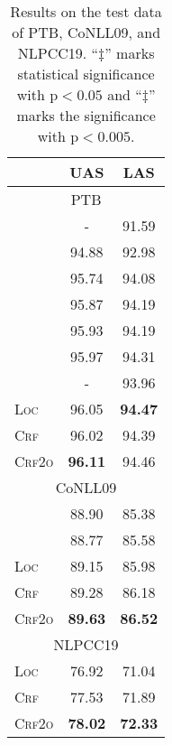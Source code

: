 \begin{table}[hbt]
  \centering
  \begin{tabular}{lcc}
  \hline
  & UAS & LAS \\
  \hline
  \hline
  \multicolumn{3}{c}{PTB} \\
  \hline
  \citet{falenska-kuhn-2019-non}     & -     & 91.59 \\
  \citet{ma-hovy-2017-neural}        & 94.88 & 92.98 \\
  \citet{Timothy-d17-biaffine}       & 95.74 & 94.08 \\
  \citet{ma-etal-2018-stack}         & 95.87 & 94.19 \\
  \citet{li-etal-2019-attentive}     & 95.93 & 94.19 \\
  \citet{ji-etal-2019-graph}         & 95.97 & 94.31 \\
  \citet{zhang-etal-2019-empirical}  & -     & 93.96 \\
  \textsc{Loc}   & 96.05          & \textbf{94.47} \\
  \textsc{Crf}     & 96.02          & 94.39 \\
  \textsc{Crf2o}  & \textbf{96.11} & 94.46 \\
  \hline
  \hline
  \multicolumn{3}{c}{CoNLL09} \\
  \hline
  \citet{Timothy-d17-biaffine}   & 88.90 & 85.38 \\
  \citet{li-etal-2019-attentive} & 88.77 & 85.58 \\
  \textsc{Loc}                 & 89.15 & 85.98 \\
  \textsc{Crf}                   & 89.28 & 86.18\rlap{$^\dagger$} \\
  \textsc{Crf2o}                & \textbf{89.63}\rlap{$^\ddagger$} & \textbf{86.52}\rlap{$^\ddagger$} \\
  \hline
  \hline
  \multicolumn{3}{c}{NLPCC19} \\
  \hline
  \textsc{Loc}  & 76.92 & 71.04 \\
  \textsc{Crf}    & 77.53\rlap{$^\ddagger$} & 71.89\rlap{$^\ddagger$} \\
  \textsc{Crf2o} & \textbf{78.02}\rlap{$^\ddagger$} & \textbf{72.33}\rlap{$^\ddagger$} \\
  \hline
  \end{tabular}
  \caption{Results on the test data of PTB, CoNLL09, and NLPCC19. ``$\ddagger$'' marks statistical significance with $\mathrm{p} < 0.05$ and ``$\ddagger$'' marks the significance with $\mathrm{p} < 0.005$.}
  \label{table:dev-test}
\end{table}


